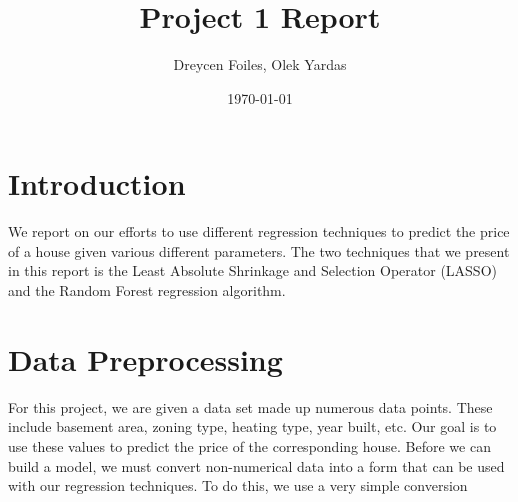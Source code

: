 \documentclass{article}
\title{Project 1 Report}
\author{Dreycen Foiles, Olek Yardas}
\date{\today}
\begin{document}
\maketitle

\section{Introduction}

We report on our efforts to use different regression techniques to predict the price of a house given various different parameters. The two techniques that we present in this report is the Least Absolute Shrinkage and Selection Operator (LASSO) and the Random Forest regression algorithm.

\section{Data Preprocessing}

For this project, we are given a data set made up numerous data points. These include basement area, zoning type, heating type, year built, etc. Our goal is to use these values to predict the price of the corresponding house. Before we can build a model, we must convert non-numerical data into a form that can be used with our regression techniques. To do this, we use a very simple conversion 
\end{document}
